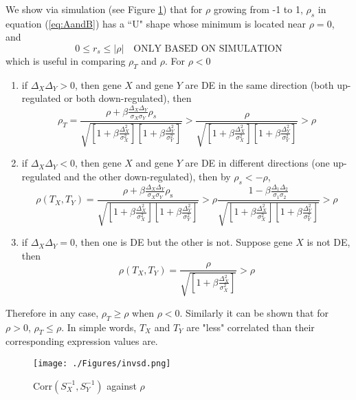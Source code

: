 \documentclass[12pt, a4paper]{article}
\newcommand{\cor}{\text{Corr}}
\begin{document}
	We show via simulation (see Figure \ref{invsd}) that for $\rho$ growing from -1 to 1, $\rho_s$
	in equation (\ref{eq:AandB}) has a ``U" shape whose minimum is located near $\rho=0$, and  
	\begin{equation}\label{rhoineq}
		0 \leq r_s \leq |\rho| \text{~~ ONLY BASED ON SIMULATION}
	\end{equation}
	which is useful in comparing  $\rho_T$  and $\rho$. 
	For $\rho <0 $
	\begin{enumerate}
		\item if $\Delta_X\Delta_Y >0$, then gene $X$ and gene $Y$ are DE in the same direction (both 
		up-regulated or both down-regulated), then 
		\begin{equation}
			\rho_T= \frac{\rho + \beta\frac{\Delta_X\Delta_Y}{\sigma_X\sigma_Y}\rho_s}{\sqrt{ 
					\left[ 1 + \beta\frac{\Delta_X^2}{\sigma_X^2}\right]\left[ 1 + \beta\frac{\Delta_Y^2}{\sigma_Y^2}\right]}} 
			>\frac{\rho }{\sqrt{  \left[ 1 + \beta\frac{\Delta_X^2}{\sigma_X^2}\right]\left[ 1 +
					\beta\frac{\Delta_Y^2}{\sigma_Y^2}\right]}} >\rho
		\end{equation}
		\item  if $\Delta_X\Delta_Y <0$, then gene $X$ and gene $Y$ are DE in different directions (one
		up-regulated and the other down-regulated), then by $\rho_s < -\rho$, 
		\[\rho(T_X, T_Y)= \frac{\rho + \beta\frac{\Delta_X\Delta_Y}{\sigma_X\sigma_Y}\rho_{\text{s}}}{\sqrt{ 
				\left[ 1 + \beta\frac{\Delta_X^2}{\sigma_X^2}\right]\left[ 1 + \beta\frac{\Delta_Y^2}{\sigma_Y^2}\right]}} 
		>\rho\frac{ 1-\beta\frac{\Delta_1\Delta_2}{\sigma_1\sigma_2}}{\sqrt{  \left[ 1 +
				\beta\frac{\Delta_X^2}{\sigma_X^2}\right]\left[ 1 + \beta\frac{\Delta_Y^2}{\sigma_Y^2}\right]}} >\rho\]
		\item if  $\Delta_X\Delta_Y =0$, then one is DE but the other is not. Suppose gene $X$ is not DE,
		then
		\[\rho(T_X, T_Y)= \frac{\rho}{\sqrt{  \left[ 1 + \beta\frac{\Delta_X^2}{\sigma_X^2}\right]}} >\rho \]
		
	\end{enumerate}
	Therefore in any case, $\rho_T \geq \rho$ when $\rho <0$. Similarly it can be shown that for
	$\rho >0$, $\rho_T \leq \rho $. In simple words,  $T_X$ and $T_Y$ are "less" correlated than their corresponding expression values are. 
	\begin{figure}[!h]
		\centering
		\caption{$\cor(S^{-1}_X, S^{-1}_Y)$ against $\rho$}
		\texttt{[image: ./Figures/invsd.png]}
		\label{invsd}
	\end{figure}
	
\end{document}
